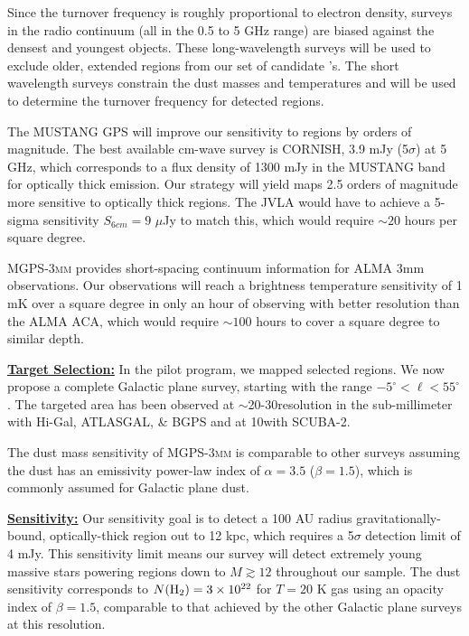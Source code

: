 \documentclass[11pt,preprint]{aastex_nofoot}
\newcommand{\MGPS}{\textsc{MGPS-3mm}\xspace}
\begin{document}
Since the turnover frequency is roughly proportional to electron density,
surveys in the radio continuum (all in the 0.5 to 5 GHz range) are 
biased against the densest and youngest objects.  These long-wavelength surveys
will be used to exclude older, extended \uchii regions from our set of
candidate \hchii's.  The short wavelength surveys constrain the dust masses and
temperatures and will be used to determine the turnover frequency for detected
\hchii regions.

The MUSTANG GPS will improve our sensitivity to \hchii regions by orders of
magnitude. The best available cm-wave survey is CORNISH, 3.9 mJy (5$\sigma$) at 5 GHz, which
corresponds to a flux density of 1300 mJy in the MUSTANG band for optically
thick emission. Our strategy will yield maps 2.5 orders of magnitude more
sensitive to optically thick \hchii regions.  The JVLA would have to achieve a
5-sigma sensitivity $S_{6cm} = 9$ $\mu$Jy to match this, which would require
$\sim20$ hours per square degree.




\MGPS provides short-spacing continuum information for
ALMA 3mm observations.  Our observations will reach a brightness temperature
sensitivity of 1 mK over a square degree in only an hour of observing with
better resolution than the ALMA ACA, which would require $\sim100$ hours to
cover a square degree to similar depth.

\indent\underline{\textbf{\helv Target Selection:}}
In the pilot program, we mapped selected regions.  We now propose a complete
Galactic plane survey, starting with the range $-5^{\circ} < \ell < 55^{\circ}$.
The targeted area has been observed at $\sim$20-30\arcsec resolution in
the sub-millimeter with Hi-Gal, ATLASGAL, \& BGPS and at
10\arcsec with SCUBA-2.  

The dust mass sensitivity of \MGPS is comparable to other surveys assuming the
dust has an emissivity power-law index of $\alpha=3.5$ ($\beta=1.5$), which is 
commonly assumed for Galactic plane
dust.

\indent\underline{\textbf{\helv Sensitivity:}}  Our sensitivity goal is to
detect a 100 AU radius gravitationally-bound, optically-thick \hii region out to 12 kpc, which requires a
5$\sigma$ detection limit of 4 mJy.  This sensitivity limit means our survey
will detect extremely young massive stars powering \hii regions down
to $M \gtrsim 12$ \msun throughout our sample.  The dust sensitivity corresponds to
$N(\textrm{H}_{2})=3\times10^{22}$ \persc for $T=20$ K gas using an opacity index of
$\beta=1.5$, comparable to that achieved by the other Galactic plane surveys at
this resolution.
\end{document}
